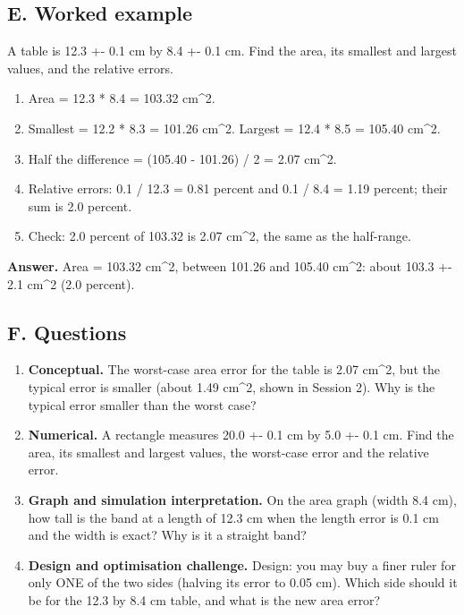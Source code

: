 \documentclass[11pt,a4paper]{article}
\begin{document}
\subsection*{E. Worked example}
A table is 12.3 +- 0.1 cm by 8.4 +- 0.1 cm. Find the area, its smallest and largest values, and the relative errors.
\begin{enumerate}[nosep]
\item Area = 12.3 * 8.4 = 103.32 cm\textasciicircum{}2.
\item Smallest = 12.2 * 8.3 = 101.26 cm\textasciicircum{}2. Largest = 12.4 * 8.5 = 105.40 cm\textasciicircum{}2.
\item Half the difference = (105.40 - 101.26) / 2 = 2.07 cm\textasciicircum{}2.
\item Relative errors: 0.1 / 12.3 = 0.81 percent and 0.1 / 8.4 = 1.19 percent; their sum is 2.0 percent.
\item Check: 2.0 percent of 103.32 is 2.07 cm\textasciicircum{}2, the same as the half-range.
\end{enumerate}
\textbf{Answer.} Area = 103.32 cm\textasciicircum{}2, between 101.26 and 105.40 cm\textasciicircum{}2: about 103.3 +- 2.1 cm\textasciicircum{}2 (2.0 percent).

\subsection*{F. Questions}
\begin{enumerate}[nosep]
\item \textbf{Conceptual.} The worst-case area error for the table is 2.07 cm\textasciicircum{}2, but the typical error is smaller (about 1.49 cm\textasciicircum{}2, shown in Session 2). Why is the typical error smaller than the worst case?
\item \textbf{Numerical.} A rectangle measures 20.0 +- 0.1 cm by 5.0 +- 0.1 cm. Find the area, its smallest and largest values, the worst-case error and the relative error.
\item \textbf{Graph and simulation interpretation.} On the area graph (width 8.4 cm), how tall is the band at a length of 12.3 cm when the length error is 0.1 cm and the width is exact? Why is it a straight band?
\item \textbf{Design and optimisation challenge.} Design: you may buy a finer ruler for only ONE of the two sides (halving its error to 0.05 cm). Which side should it be for the 12.3 by 8.4 cm table, and what is the new area error?
\end{enumerate}
\end{document}
